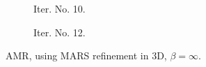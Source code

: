 \documentclass[a4paper,12pt]{amsart}
\numberwithin{equation}{section}
\begin{document}
\begin{figure}[h!]
\begin{subfigure}[t]{0.49\textwidth}
    \caption{Iter. No. 10.}
\end{subfigure}
	\hfill
\begin{subfigure}[t]{0.49\textwidth}
    \caption{Iter. No. 12.}
\end{subfigure}

\caption{AMR, using MARS refinement in 3D, $\beta = \infty$.}
\label{fig:amr_trans3D_mars}
\end{figure}
\end{document}

